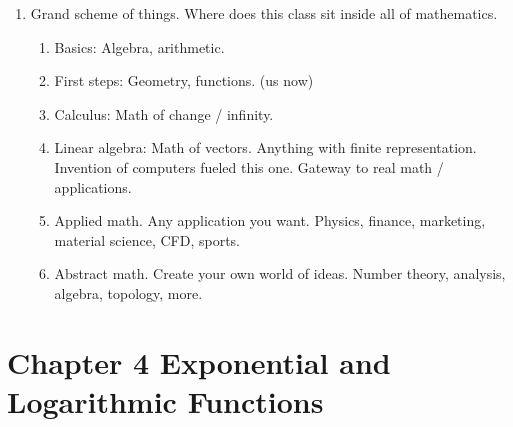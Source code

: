 \documentclass{article}
\begin{document}
\begin{enumerate}
\item Grand scheme of things. Where does this class sit inside all of mathematics.
\begin{enumerate}
\item Basics: Algebra, arithmetic.
\item First steps: Geometry, functions. (us now)
\item Calculus: Math of change / infinity.
\item Linear algebra: Math of vectors. Anything with finite representation. Invention of computers fueled this one. Gateway to real math / applications.
\item Applied math. Any application you want. Physics, finance, marketing, material science, CFD, sports. 
\item Abstract math. Create your own world of ideas. Number theory, analysis, algebra, topology, more. 
\end{enumerate}
\end{enumerate}


\section{Chapter 4 Exponential and Logarithmic Functions}


\end{document}
